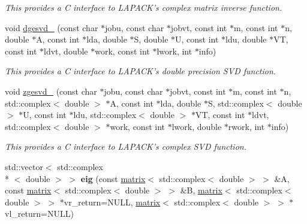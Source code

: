 \begin{DoxyCompactItemize}
\begin{DoxyCompactList}\small\item\em This provides a C interface to L\-A\-P\-A\-C\-K's complex matrix inverse function. \end{DoxyCompactList}\item 
\hypertarget{namespacekeycpp_a8fe7a71afbb6c5dc049cdd7afff6c0af}{void \hyperlink{namespacekeycpp_a8fe7a71afbb6c5dc049cdd7afff6c0af}{dgesvd\-\_\-} (const char $\ast$jobu, const char $\ast$jobvt, const int $\ast$m, const int $\ast$n, double $\ast$A, const int $\ast$lda, double $\ast$S, double $\ast$U, const int $\ast$ldu, double $\ast$V\-T, const int $\ast$ldvt, double $\ast$work, const int $\ast$lwork, int $\ast$info)}\label{namespacekeycpp_a8fe7a71afbb6c5dc049cdd7afff6c0af}

\begin{DoxyCompactList}\small\item\em This provides a C interface to L\-A\-P\-A\-C\-K's double precision S\-V\-D function. \end{DoxyCompactList}\item 
\hypertarget{namespacekeycpp_afa5e2f74110f53bd288c15ce1f183f9b}{void \hyperlink{namespacekeycpp_afa5e2f74110f53bd288c15ce1f183f9b}{zgesvd\-\_\-} (const char $\ast$jobu, const char $\ast$jobvt, const int $\ast$m, const int $\ast$n, std\-::complex$<$ double $>$ $\ast$A, const int $\ast$lda, double $\ast$S, std\-::complex$<$ double $>$ $\ast$U, const int $\ast$ldu, std\-::complex$<$ double $>$ $\ast$V\-T, const int $\ast$ldvt, std\-::complex$<$ double $>$ $\ast$work, const int $\ast$lwork, double $\ast$rwork, int $\ast$info)}\label{namespacekeycpp_afa5e2f74110f53bd288c15ce1f183f9b}

\begin{DoxyCompactList}\small\item\em This provides a C interface to L\-A\-P\-A\-C\-K's complex S\-V\-D function. \end{DoxyCompactList}\item 
\hypertarget{namespacekeycpp_a61795f58aa135cfa0ebb4325f52f9de6}{std\-::vector$<$ std\-::complex\\*
$<$ double $>$ $>$ {\bfseries eig} (const \hyperlink{classkeycpp_1_1matrix}{matrix}$<$ std\-::complex$<$ double $>$ $>$ \&A, const \hyperlink{classkeycpp_1_1matrix}{matrix}$<$ std\-::complex$<$ double $>$ $>$ \&B, \hyperlink{classkeycpp_1_1matrix}{matrix}$<$ std\-::complex$<$ double $>$ $>$ $\ast$vr\-\_\-return=N\-U\-L\-L, \hyperlink{classkeycpp_1_1matrix}{matrix}$<$ std\-::complex$<$ double $>$ $>$ $\ast$vl\-\_\-return=N\-U\-L\-L)}\label{namespacekeycpp_a61795f58aa135cfa0ebb4325f52f9de6}


\end{DoxyCompactItemize}
